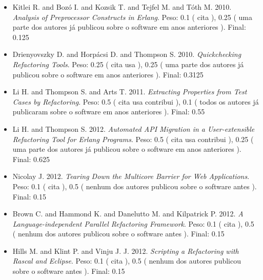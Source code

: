 \begin{itemize}
\item Kitlei R. and Boz\'{o} I. and Kozsik T. and Tejfel M. and T\'{o}th M.
      2010.
        \textit{ Analysis of Preprocessor Constructs in Erlang}.
      Peso:
      0.1 (
          cita
      ),
      0.25 (
uma parte dos autores já publicou sobre o software em anos anteriores
      ).
      Final:
      0.125

\item Drienyovszky D. and Horp\'{a}csi D. and Thompson S.
      2010.
        \textit{ Quickchecking Refactoring Tools}.
      Peso:
      0.25 (
          cita
          usa
      ),
      0.25 (
uma parte dos autores já publicou sobre o software em anos anteriores
      ).
      Final:
      0.3125

\item Li H. and Thompson S. and Arts T.
      2011.
        \textit{ Extracting Properties from Test Cases by Refactoring}.
      Peso:
      0.5 (
          cita
          usa
          contribui
      ),
      0.1 (
todos os autores já publicaram sobre o software em anos anteriores
      ).
      Final:
      0.55

\item Li H. and Thompson S.
      2012.
        \textit{ Automated API Migration in a User-extensible Refactoring Tool for Erlang Programs}.
      Peso:
      0.5 (
          cita
          usa
          contribui
      ),
      0.25 (
uma parte dos autores já publicou sobre o software em anos anteriores
      ).
      Final:
      0.625

\item Nicolay J.
      2012.
        \textit{ Tearing Down the Multicore Barrier for Web Applications}.
      Peso:
      0.1 (
          cita
      ),
      0.5 (
nenhum dos autores publicou sobre o software antes
      ).
      Final:
      0.15

\item Brown C. and Hammond K. and Danelutto M. and Kilpatrick P.
      2012.
        \textit{ A Language-independent Parallel Refactoring Framework}.
      Peso:
      0.1 (
          cita
      ),
      0.5 (
nenhum dos autores publicou sobre o software antes
      ).
      Final:
      0.15

\item Hills M. and Klint P. and Vinju J. J.
      2012.
        \textit{ Scripting a Refactoring with Rascal and Eclipse}.
      Peso:
      0.1 (
          cita
      ),
      0.5 (
nenhum dos autores publicou sobre o software antes
      ).
      Final:
      0.15


\end{itemize}
